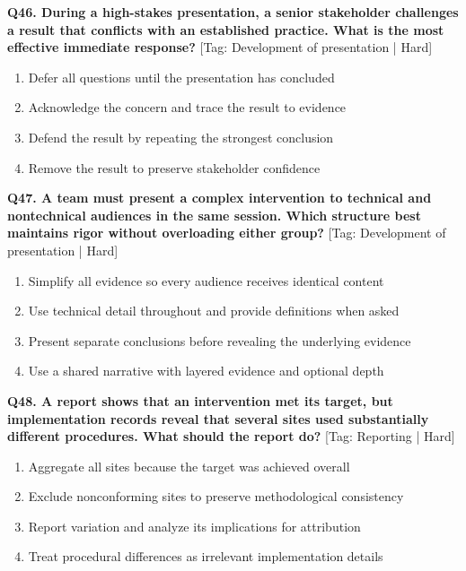 \noindent\textbf{Q46. During a high-stakes presentation, a senior stakeholder challenges a result that conflicts with an established practice. What is the most effective immediate response?} \hfill [Tag: Development of presentation | Hard]
\begin{enumerate}[label=(\alph*),topsep=2pt,itemsep=1pt,partopsep=0pt,parsep=0pt]
    \item {Defer all questions until the presentation has concluded}
    \item {Acknowledge the concern and trace the result to evidence}
    \item {Defend the result by repeating the strongest conclusion}
    \item {Remove the result to preserve stakeholder confidence}
\end{enumerate}
\vspace{2mm}

\noindent\textbf{Q47. A team must present a complex intervention to technical and nontechnical audiences in the same session. Which structure best maintains rigor without overloading either group?} \hfill [Tag: Development of presentation | Hard]
\begin{enumerate}[label=(\alph*),topsep=2pt,itemsep=1pt,partopsep=0pt,parsep=0pt]
    \item {Simplify all evidence so every audience receives identical content}
    \item {Use technical detail throughout and provide definitions when asked}
    \item {Present separate conclusions before revealing the underlying evidence}
    \item {Use a shared narrative with layered evidence and optional depth}
\end{enumerate}
\vspace{2mm}

\noindent\textbf{Q48. A report shows that an intervention met its target, but implementation records reveal that several sites used substantially different procedures. What should the report do?} \hfill [Tag: Reporting | Hard]
\begin{enumerate}[label=(\alph*),topsep=2pt,itemsep=1pt,partopsep=0pt,parsep=0pt]
    \item {Aggregate all sites because the target was achieved overall}
    \item {Exclude nonconforming sites to preserve methodological consistency}
    \item {Report variation and analyze its implications for attribution}
    \item {Treat procedural differences as irrelevant implementation details}
\end{enumerate}
\vspace{2mm}

